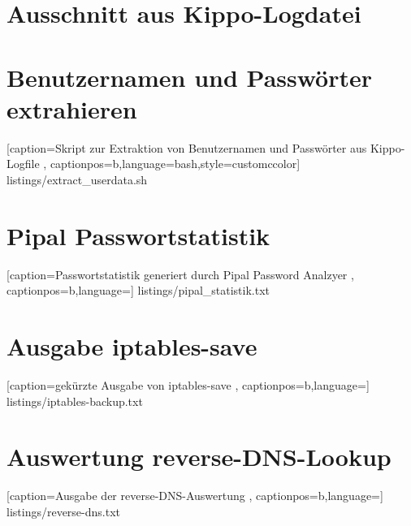 \section*{Ausschnitt aus Kippo-Logdatei}
\label{app:Ausschnitt aus Kippo-Logdatei}



\newpage

\section*{Benutzernamen und Passwörter extrahieren}
\label{app:Benutzernamen und Passwörter extrahieren}


    [caption={Skript zur Extraktion von Benutzernamen und Passwörter aus Kippo-Logfile}
       \label{lst:mitm_onmsg},
       captionpos=b,language=bash,style=customccolor]
 {listings/extract_userdata.sh}
 
 
\newpage
 
\section*{Pipal Passwortstatistik}
\label{app:Pipal Passwortstatistik}


    [caption={Passwortstatistik generiert durch Pipal Password Analzyer}
       \label{lst:mitm_onmsg},
       captionpos=b,language={}]
 {listings/pipal_statistik.txt}
 
 
\newpage 
 
\section*{Ausgabe iptables-save}
\label{app:Ausgabe iptables-save}


    [caption={gekürzte Ausgabe von iptables-save}
       \label{lst:mitm_onmsg},
       captionpos=b,language={}]
 {listings/iptables-backup.txt}
 

\newpage 
 
\section*{Auswertung reverse-DNS-Lookup}
\label{app:Auswertung reverse-DNS-Lookup}


    [caption={Ausgabe der reverse-DNS-Auswertung}
       \label{lst:reverse_dns},
       captionpos=b,language={}]
 {listings/reverse-dns.txt}